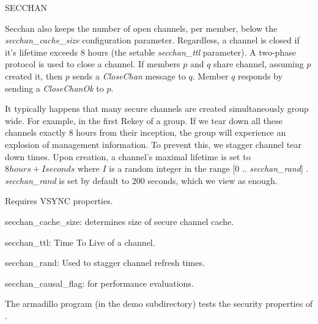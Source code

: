 \begin{Layer}{SECCHAN}
\begin{Protocol}
Secchan also keeps the number of open channels, per member, below the
{\it secchan\_cache\_size} configuration parameter. Regardless, a
channel is closed if it's lifetime exceeds 8 hours (the setable {\it
secchan\_ttl} parameter).  A two-phase protocol is used to close a
channel. If members $p$ and $q$ share channel, assuming $p$ created
it, then $p$ sends a {\it CloseChan} message to $q$.  Member $q$
responds by sending a {\it CloseChanOk} to $p$.

It typically happens that many secure channels are created
simultaneously group wide. For example, in the first Rekey of a
group. If we tear down all these channels exactly 8 hours from their
inception, the group will experience an explosion of management
information. To prevent this, we stagger channel tear down times.
Upon creation, a channel's maximal lifetime is set to $8 hours + I
seconds$ where $I$ is a random integer in the range [0 ..{\it
secchan\_rand}] . {\it secchan\_rand} is set by default to 200 seconds,
which we view as enough.

\end{Protocol}

\begin{Properties}
\item Requires VSYNC properties.
\end{Properties}

\begin{Parameters}
\item{secchan\_cache\_size:} determines size of secure channel cache. 
\item{secchan\_ttl:} Time To Live of a channel.
\item{secchan\_rand:} Used to stagger channel refresh times.
\item {secchan\_causal\_flag:} for performance evaluations.
\end{Parameters}

\begin{Sources}
\end{Sources}

\begin{GenEvent}
\genevent{\DnCast}
\genevent{\DnSend}
\end{GenEvent}

\begin{Testing}
\item 
The armadillo program (in the demo subdirectory) tests the security properties
of \ensemble.
\end{Testing}

\end{Layer}



